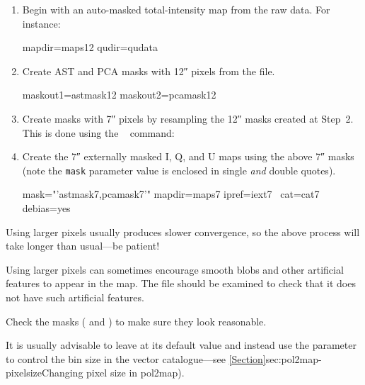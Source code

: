 \begin{enumerate}
\item Begin with an auto-masked total-intensity map from the raw
  data. For instance:

\begin{terminalv}
     mapdir=maps12 qudir=qudata
\end{terminalv}


\item Create AST and PCA masks with 12\si{\arcsecond} pixels from the
   file.


\begin{terminalv}
     maskout1=astmask12 maskout2=pcamask12
\end{terminalv}

\item Create masks with 7\si{\arcsecond} pixels by resampling the
  12\si{\arcsecond} masks created at Step~2. This is done using the
  \Kappa\  command:

\begin{terminalv}
\end{terminalv}

\item Create the 7\si{\arcsecond} externally masked I, Q, and U maps
  using the above 7\si{\arcsecond} masks (note the \texttt{mask}
  parameter value is enclosed in single \emph{and} double quotes).

\begin{terminalv}
                  mask="'astmask7,pcamask7'" mapdir=maps7 ipref=iext7  \
                  cat=cat7 debias=yes
\end{terminalv}
\end{enumerate}

\begin{tip}
  Using larger pixels usually produces slower convergence, so the
  above process will take longer than usual---be patient!

  Using larger pixels can sometimes encourage smooth blobs and other
  artificial features to appear in the map. The \file{iauto12.sdf} file
  should be examined to check that it does not have such artificial
  features.

  Check the masks ( and ) to make sure they
  look reasonable.

  It is usually advisable to leave  at its default value
  and instead use the \param{BINSIZE} parameter to control the bin size in
  the vector catalogue---see \cref{Section}{sec:pol2map-pixelsize}{Changing pixel size in pol2map}).
\end{tip}


